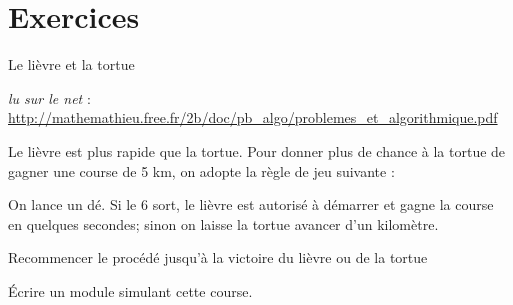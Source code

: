 
\clearpage
\section{Exercices}

\begin{Exercice}{Le lièvre et la tortue}

	\emph{lu sur le net} :
	{\footnotesize \url{http://mathemathieu.free.fr/2b/doc/pb_algo/problemes_et_algorithmique.pdf}}
	
	Le lièvre est plus rapide que la tortue.
	Pour donner plus de chance à la tortue de gagner une course de 5 km, 
	on adopte la règle de jeu suivante :
	
	On lance un dé. 
	Si le 6 sort, le lièvre est autorisé à démarrer et gagne la course en quelques
	secondes; sinon on laisse la tortue avancer d’un kilomètre.
	
	Recommencer le procédé jusqu'à la victoire du lièvre ou de la tortue
	
	Écrire un module simulant cette course.
\end{Exercice}

